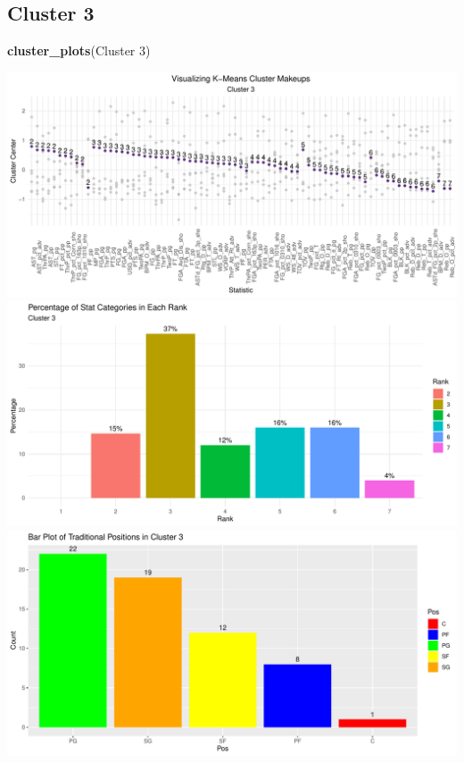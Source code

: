 \documentclass[
]{article}
\newenvironment{Shaded}{\begin{snugshade}}{\end{snugshade}}
\newcommand{\FunctionTok}[1]{\textcolor[rgb]{0.13,0.29,0.53}{\textbf{#1}}}
\newcommand{\NormalTok}[1]{#1}
\newcommand{\StringTok}[1]{\textcolor[rgb]{0.31,0.60,0.02}{#1}}
\begin{document}
\hypertarget{cluster-3}{%
\subsection{Cluster 3}\label{cluster-3}}

\begin{Shaded}
\begin{Highlighting}[]
\FunctionTok{cluster\_plots}\NormalTok{(}\StringTok{\textquotesingle{}Cluster 3\textquotesingle{}}\NormalTok{)}
\end{Highlighting}
\end{Shaded}

\includegraphics{Reclassifying-NBA-Player-Postions-Pt.-3---Clustering-Analysis-Results_files/figure-latex/unnamed-chunk-4-1.pdf}
\includegraphics{Reclassifying-NBA-Player-Postions-Pt.-3---Clustering-Analysis-Results_files/figure-latex/unnamed-chunk-4-2.pdf}
\includegraphics{Reclassifying-NBA-Player-Postions-Pt.-3---Clustering-Analysis-Results_files/figure-latex/unnamed-chunk-4-3.pdf}
\end{document}
